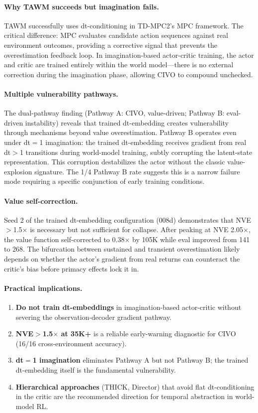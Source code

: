 \documentclass[10pt,letterpaper]{article}
\begin{document}
\paragraph{Why TAWM succeeds but imagination fails.}
TAWM \citep{nhu2025tawm} successfully uses dt-conditioning in TD-MPC2's MPC framework.
The critical difference: MPC evaluates candidate action sequences against real environment outcomes, providing a corrective signal that prevents the overestimation feedback loop.
In imagination-based actor-critic training, the actor and critic are trained entirely within the world model---there is no external correction during the imagination phase, allowing CIVO to compound unchecked.

\paragraph{Multiple vulnerability pathways.}
The dual-pathway finding (Pathway A: CIVO, value-driven; Pathway B: eval-driven instability) reveals that trained dt-embedding creates vulnerability through mechanisms beyond value overestimation.
Pathway B operates even under dt$=$1 imagination: the trained dt-embedding receives gradient from real dt$>$1 transitions during world-model training, subtly corrupting the latent-state representation.
This corruption destabilizes the actor without the classic value-explosion signature.
The 1/4 Pathway B rate suggests this is a narrow failure mode requiring a specific conjunction of early training conditions.

\paragraph{Value self-correction.}
Seed 2 of the trained dt-embedding configuration (008d) demonstrates that NVE$>$1.5$\times$ is necessary but not sufficient for collapse.
After peaking at NVE 2.05$\times$, the value function self-corrected to 0.38$\times$ by 105K while eval improved from 141 to 268.
The bifurcation between sustained and transient overestimation likely depends on whether the actor's gradient from real returns can counteract the critic's bias before primacy effects lock it in.

\paragraph{Practical implications.}
\begin{enumerate}
    \item \textbf{Do not train dt-embeddings} in imagination-based actor-critic without severing the observation-decoder gradient pathway.
    \item \textbf{NVE$>$1.5$\times$ at 35K+} is a reliable early-warning diagnostic for CIVO (16/16 cross-environment accuracy).
    \item \textbf{dt$=$1 imagination} eliminates Pathway A but not Pathway B; the trained dt-embedding itself is the fundamental vulnerability.
    \item \textbf{Hierarchical approaches} (THICK, Director) that avoid flat dt-conditioning in the critic are the recommended direction for temporal abstraction in world-model RL.
\end{enumerate}
\end{document}
